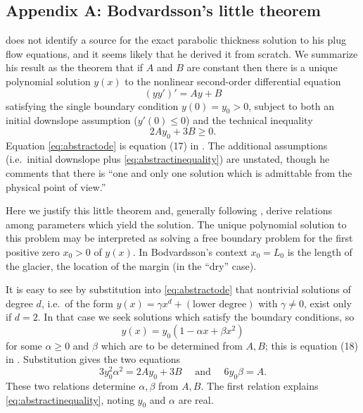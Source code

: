 \documentclass[review,letterpaper]{igs}
\begin{document}
\appendix

\subsection{Appendix A: Bodvardsson's little theorem}  \cite{Bodvardsson} does not identify a source for the exact parabolic thickness solution to his plug flow equations, and it seems likely that he derived it from scratch.  We summarize his result as the theorem that if $A$ and $B$ are constant then there is a unique polynomial solution $y(x)$ to the nonlinear second-order differential equation
\begin{equation}
  (y y')' = Ay+B  \label{eq:abstractode}
\end{equation}
satisfying the single boundary condition $y(0) = y_0 > 0$, subject to both an initial downslope assumption ($y'(0) \le 0$) and the technical inequality
\begin{equation}
2A y_0 + 3 B \ge 0.  \label{eq:abstractinequality}
\end{equation}
Equation \eqref{eq:abstractode} is equation (17) in \cite{Bodvardsson}.  The additional assumptions (i.e.~initial downslope plus \eqref{eq:abstractinequality}) are unstated, though he comments that there is ``one and only one solution which is admittable from the physical point of view.''

Here we justify this little theorem and, generally following \cite{Bodvardsson}, derive relations among parameters which yield the solution.  The unique polynomial solution to this problem may be interpreted as solving a free boundary problem for the first positive zero $x_0>0$ of $y(x)$.  In Bodvardsson's context $x_0=L_0$ is the length of the glacier, the location of the margin (in the ``dry'' case).

It is easy to see by substitution into \eqref{eq:abstractode} that nontrivial solutions of degree $d$, i.e.~of the form $y(x) = \gamma x^d + (\text{lower degree})$ with $\gamma\ne 0$, exist only if $d=2$.  In that case we seek solutions which satisfy the boundary conditions, so
\begin{equation}
y(x) = y_0(1 - \alpha x + \beta x^2)  \label{eq:abstractsoln}
\end{equation}
for some $\alpha\ge 0$ and $\beta$ which are to be determined from $A,B$; this is equation (18) in \citep{Bodvardsson}.  Substitution gives the two equations
\begin{equation}
3 y_0^2 \alpha^2 = 2 A y_0 + 3 B \quad \text{ and } \quad 6 y_0 \beta = A.  \label{eq:abstractrelations}
\end{equation}
These two relations determine $\alpha,\beta$ from $A,B$.  The first relation explains \eqref{eq:abstractinequality}, noting $y_0$ and $\alpha$ are real.
\end{document}
